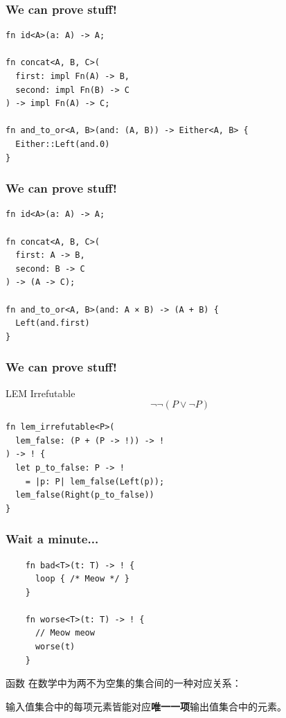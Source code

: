 \documentclass[UTF-8]{ctexbeamer}
\begin{document}
\begin{frame}[fragile]
  \frametitle{We can prove stuff!}

  \begin{verbatim}
fn id<A>(a: A) -> A;

fn concat<A, B, C>(
  first: impl Fn(A) -> B,
  second: impl Fn(B) -> C
) -> impl Fn(A) -> C;

fn and_to_or<A, B>(and: (A, B)) -> Either<A, B> {
  Either::Left(and.0)
}
  \end{verbatim}
\end{frame}

\begin{frame}[fragile]
  \frametitle{We can prove stuff!}

  \begin{verbatim}
fn id<A>(a: A) -> A;

fn concat<A, B, C>(
  first: A -> B,
  second: B -> C
) -> (A -> C);

fn and_to_or<A, B>(and: A × B) -> (A + B) {
  Left(and.first)
}
  \end{verbatim}
\end{frame}

\begin{frame}[fragile]
  \frametitle{We can prove stuff!}

  \begin{block}{LEM Irrefutable}
  $$
  \neg \neg (P \lor \neg P)
  $$
  \end{block}

  \pause
  \vspace{2em}

  \begin{verbatim}
fn lem_irrefutable<P>(
  lem_false: (P + (P -> !)) -> !
) -> ! {
  let p_to_false: P -> !
    = |p: P| lem_false(Left(p));
  lem_false(Right(p_to_false))
}
  \end{verbatim}
\end{frame}

\begin{frame}[fragile]
  \frametitle{Wait a minute...}

  \pause

  \begin{verbatim}
    fn bad<T>(t: T) -> ! {
      loop { /* Meow */ }
    }

    fn worse<T>(t: T) -> ! {
      // Meow meow
      worse(t)
    }
  \end{verbatim}

  \pause

  \vspace{1em}

  \begin{block}{函数}
    在数学中为两不为空集的集合间的一种对应关系：
    
    输入值集合中的每项元素皆能对应\textbf{唯一一项}输出值集合中的元素。
  \end{block}
\end{frame}
\end{document}

